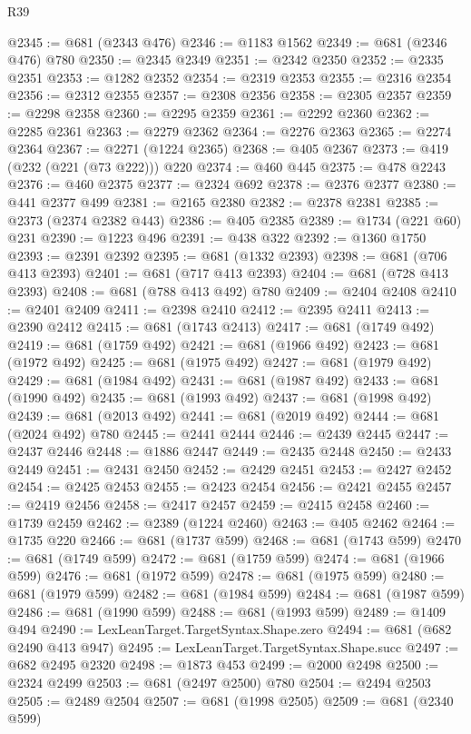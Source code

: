 \begin{lexlean}{R39}
\begin{coremodule}
@2345 := @681 (@2343 @476)
@2346 := @1183 @1562
@2349 := @681 (@2346 @476) @780
@2350 := @2345 @2349
@2351 := @2342 @2350
@2352 := @2335 @2351
@2353 := @1282 @2352
@2354 := @2319 @2353
@2355 := @2316 @2354
@2356 := @2312 @2355
@2357 := @2308 @2356
@2358 := @2305 @2357
@2359 := @2298 @2358
@2360 := @2295 @2359
@2361 := @2292 @2360
@2362 := @2285 @2361
@2363 := @2279 @2362
@2364 := @2276 @2363
@2365 := @2274 @2364
@2367 := @2271 (@1224 @2365)
@2368 := @405 @2367
@2373 := @419 (@232 (@221 (@73 @222))) @220
@2374 := @460 @445
@2375 := @478 @2243
@2376 := @460 @2375
@2377 := @2324 @692
@2378 := @2376 @2377
@2380 := @441 @2377 @499
@2381 := @2165 @2380
@2382 := @2378 @2381
@2385 := @2373 (@2374 @2382 @443)
@2386 := @405 @2385
@2389 := @1734 (@221 @60) @231
@2390 := @1223 @496
@2391 := @438 @322
@2392 := @1360 @1750
@2393 := @2391 @2392
@2395 := @681 (@1332 @2393)
@2398 := @681 (@706 @413 @2393)
@2401 := @681 (@717 @413 @2393)
@2404 := @681 (@728 @413 @2393)
@2408 := @681 (@788 @413 @492) @780
@2409 := @2404 @2408
@2410 := @2401 @2409
@2411 := @2398 @2410
@2412 := @2395 @2411
@2413 := @2390 @2412
@2415 := @681 (@1743 @2413)
@2417 := @681 (@1749 @492)
@2419 := @681 (@1759 @492)
@2421 := @681 (@1966 @492)
@2423 := @681 (@1972 @492)
@2425 := @681 (@1975 @492)
@2427 := @681 (@1979 @492)
@2429 := @681 (@1984 @492)
@2431 := @681 (@1987 @492)
@2433 := @681 (@1990 @492)
@2435 := @681 (@1993 @492)
@2437 := @681 (@1998 @492)
@2439 := @681 (@2013 @492)
@2441 := @681 (@2019 @492)
@2444 := @681 (@2024 @492) @780
@2445 := @2441 @2444
@2446 := @2439 @2445
@2447 := @2437 @2446
@2448 := @1886 @2447
@2449 := @2435 @2448
@2450 := @2433 @2449
@2451 := @2431 @2450
@2452 := @2429 @2451
@2453 := @2427 @2452
@2454 := @2425 @2453
@2455 := @2423 @2454
@2456 := @2421 @2455
@2457 := @2419 @2456
@2458 := @2417 @2457
@2459 := @2415 @2458
@2460 := @1739 @2459
@2462 := @2389 (@1224 @2460)
@2463 := @405 @2462
@2464 := @1735 @220
@2466 := @681 (@1737 @599)
@2468 := @681 (@1743 @599)
@2470 := @681 (@1749 @599)
@2472 := @681 (@1759 @599)
@2474 := @681 (@1966 @599)
@2476 := @681 (@1972 @599)
@2478 := @681 (@1975 @599)
@2480 := @681 (@1979 @599)
@2482 := @681 (@1984 @599)
@2484 := @681 (@1987 @599)
@2486 := @681 (@1990 @599)
@2488 := @681 (@1993 @599)
@2489 := @1409 @494
@2490 := LexLeanTarget.TargetSyntax.Shape.zero
@2494 := @681 (@682 @2490 @413 @947)
@2495 := LexLeanTarget.TargetSyntax.Shape.succ
@2497 := @682 @2495 @2320
@2498 := @1873 @453
@2499 := @2000 @2498
@2500 := @2324 @2499
@2503 := @681 (@2497 @2500) @780
@2504 := @2494 @2503
@2505 := @2489 @2504
@2507 := @681 (@1998 @2505)
@2509 := @681 (@2340 @599)

\end{coremodule}
\end{lexlean}
